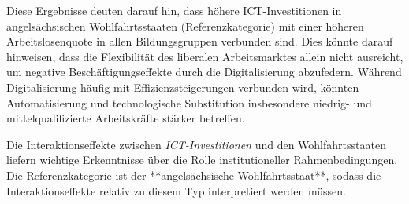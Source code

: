 Diese Ergebnisse deuten darauf hin, dass höhere ICT-Investitionen in angelsächsischen 
Wohlfahrtsstaaten (Referenzkategorie) mit einer höheren Arbeitslosenquote in allen 
Bildungsgruppen verbunden sind. Dies könnte darauf hinweisen, dass die Flexibilität des 
liberalen Arbeitsmarktes allein nicht ausreicht, um negative Beschäftigungseffekte durch die 
Digitalisierung abzufedern. Während Digitalisierung häufig mit Effizienzsteigerungen verbunden 
wird, könnten Automatisierung und technologische Substitution insbesondere niedrig- und 
mittelqualifizierte Arbeitskräfte stärker betreffen.

Die Interaktionseffekte zwischen \textit{\ac{ICT}-Investitionen} und den 
Wohlfahrtsstaaten liefern wichtige Erkenntnisse über die Rolle institutioneller 
Rahmenbedingungen. Die Referenzkategorie ist der **angelsächsische Wohlfahrtsstaat**, sodass 
die Interaktionseffekte relativ zu diesem Typ interpretiert werden müssen.


